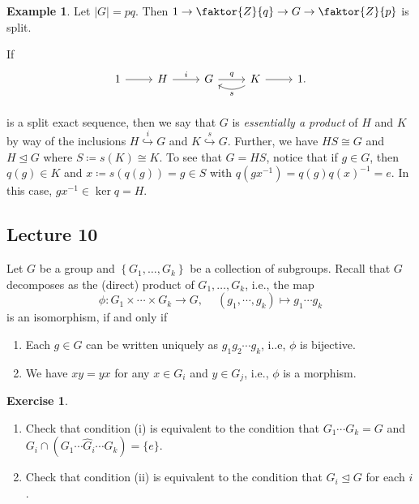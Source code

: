 \documentclass[10pt,letterpaper,cm]{nupset}
\theoremstyle{definition}
\newtheorem{exmp}[definition]{Example}
\theoremstyle{theorem}
\newtheorem{exercise}[definition]{Exercise}
\theoremstyle{remark}
\newcommand{\1}{\mathbf{1}}
\newcommand{\0}{\vec 0}
\begin{document}
\begin{exmp}
Let $\lvert{G}\rvert= pq$. Then $1 \to \faktor{Z}{q} \to G \to \faktor{Z}{p}$ is split.
\end{exmp}

\medskip

If  \[
	\begin{tikzcd}
	1\rar & H\rar["i" above] & G\rar["q" above] & K\rar\lar[bend left=30,"s" below] & 1. \\
	\end{tikzcd}
\]
is a split exact sequence, then we say that $G$ is \textit{essentially a product} of $H$ and $K$ by way of the inclusions $H \overset{i}{\hookrightarrow} G$ and $K \overset{s}{\hookrightarrow} G$. Further, we have $HS \cong G$ and $H \unlhd G$ where $S\coloneqq s(K) \cong K$. To see that $G = HS$, notice that if $g \in G$, then $q(g) \in K$ and $x\coloneqq  s(q(g)) = g \in S$ with $q(gx^{-1}) = q(g)q(x)^{-1} = e$. In this case, $gx^{-1} \in \ker{q} = H$.


\subsection{Lecture 10}


Let $G$ be a group and $\left\{G_1, \ldots, G_k\right\}$ be a collection of subgroups. Recall that $G$ decomposes as the (direct) product of $G_1, \ldots, G_k$, i.e., the map $$\phi : G_1 \times \cdots \times G_k \to G,\ \quad  (g_1, \cdots, g_k) \mapsto g_1\cdots g_k$$ is an isomorphism, if and only if
\begin{enumerate}[label=(\roman*)]
\item Each $g\in G$ can be written uniquely as $g_1 g_2\cdots g_k$, i..e, $\phi$ is bijective.
\item We have $xy = yx$ for any $x \in G_i$ and $y\in G_j$, i.e., $\phi$ is a morphism.
\end{enumerate}


\begin{exercise} $ $
\begin{enumerate}
\item Check that condition (i) is equivalent to the condition that $G_1 \cdots G_k = G$ and $G_i \cap (G_1 \cdots \widehat{G}_i \cdots G_k) = \{e\}$.
\item Check that condition (ii) is equivalent to the condition that $G_i \unlhd G$ for each $i$.
\end{enumerate}
\end{exercise}
\end{document}
